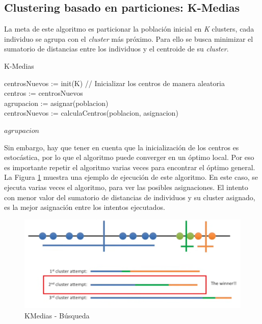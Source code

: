 	\subsection{Clustering basado en particiones: K-Medias}

		La meta de este algoritmo es particionar la población inicial en \textit{K} clusters, cada individuo se agrupa con el \textit{cluster} más próximo. Para ello se busca minimizar el sumatorio de distancias entre los individuos y el centroide de su \textit{cluster}. 
		
		
		\begin{algorithm}[!h]
			\caption{K-Medias}
			centrosNuevos := init(K) // Inicializar los centros de manera aleatoria\\
			
			{
				centros := centrosNuevos\\
				agrupacion := asignar(poblacion)\\
				centrosNuevos := calculaCentros(poblacion, asignacion)
			}
			
			
			\Return $agrupacion$\;
		\end{algorithm}
		
		Sin embargo, hay que tener en cuenta que la inicialización de los centros es estocástica, por lo que el algoritmo puede converger en un óptimo local. Por eso es importante repetir el algoritmo varias veces para encontrar el óptimo general. La Figura \ref{fig:kmediasBusqueda} muestra una ejemplo de ejecución de este algoritmo. En este caso, se ejecuta varias veces el algoritmo, para ver las posibles asignaciones. El intento con menor valor del sumatorio de distancias de individuos y su cluster asignado, es la mejor asignación entre los intentos ejecutados.



		\begin{figure}[!h]
			\centering
			\includegraphics[width=1\textwidth]{images/chapter_2/kmedias}
			\caption{KMedias - Búsqueda}
			\label{fig:kmediasBusqueda}
		\end{figure}


